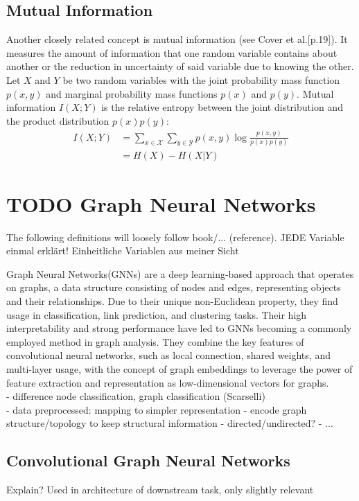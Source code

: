 \subsection{Mutual Information}
Another closely related concept is mutual information (see Cover et al.\cite{Cover2005}[p.19]). It measures the amount of information that one random variable contains about another or the reduction in uncertainty of said variable due to knowing the other.
Let $X$ and $Y$ be two random variables with the joint probability mass function $p(x,y)$ and marginal probability mass functions $p(x)$ and $p(y)$. Mutual information $I(X;Y)$ is the relative entropy between the joint distribution and the product distribution $p(x)p(y)$: 
\begin{align}
    I(X;Y)&=\sum_{x \in \mathcal{X}}\sum_{y \in \mathcal{Y}} p(x,y)\log \frac{p(x,y)}{p(x)p(y)} \\
    &= H(X) - H(X|Y)
\end{align}

\section{TODO Graph Neural Networks}

The following definitions will loosely follow book/... (reference).
JEDE Variable einmal erklärt! Einheitliche Variablen aus meiner Sicht

Graph Neural Networks(GNNs)\cite{4700287} are a deep learning-based approach that operates on graphs, a data structure consisting of nodes and edges, representing objects and their relationships. Due to their unique non-Euclidean property, they find usage in classification, link prediction, and clustering tasks. Their high interpretability and strong performance have led to GNNs becoming a commonly employed method in graph analysis. They combine the key features of convolutional neural networks\cite{726791}, such as local connection, shared weights, and multi-layer usage, with the concept of graph embeddings\cite{cai2018comprehensive} to leverage the power of feature extraction and representation as low-dimensional vectors for graphs\cite{Liu2020}. \\
- difference node classification, graph classification (Scarselli) \\
- data preprocessed: mapping to simpler representation
- encode graph structure/topology to keep structural information
- directed/undirected?
- ...



\subsection{Convolutional Graph Neural Networks}
Explain? Used in architecture of downstream task, only slightly relevant

